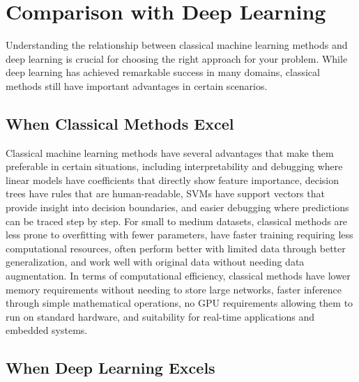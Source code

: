 
\section{Comparison with Deep Learning }
\label{sec:comparison}

Understanding the relationship between classical machine learning methods and deep learning is crucial for choosing the right approach for your problem. While deep learning has achieved remarkable success in many domains, classical methods still have important advantages in certain scenarios.

\subsection{When Classical Methods Excel}

Classical machine learning methods have several advantages that make them preferable in certain situations, including interpretability and debugging where linear models have coefficients that directly show feature importance, decision trees have rules that are human-readable, SVMs have support vectors that provide insight into decision boundaries, and easier debugging where predictions can be traced step by step. For small to medium datasets, classical methods are less prone to overfitting with fewer parameters, have faster training requiring less computational resources, often perform better with limited data through better generalization, and work well with original data without needing data augmentation. In terms of computational efficiency, classical methods have lower memory requirements without needing to store large networks, faster inference through simple mathematical operations, no GPU requirements allowing them to run on standard hardware, and suitability for real-time applications and embedded systems.

\subsection{When Deep Learning Excels}

